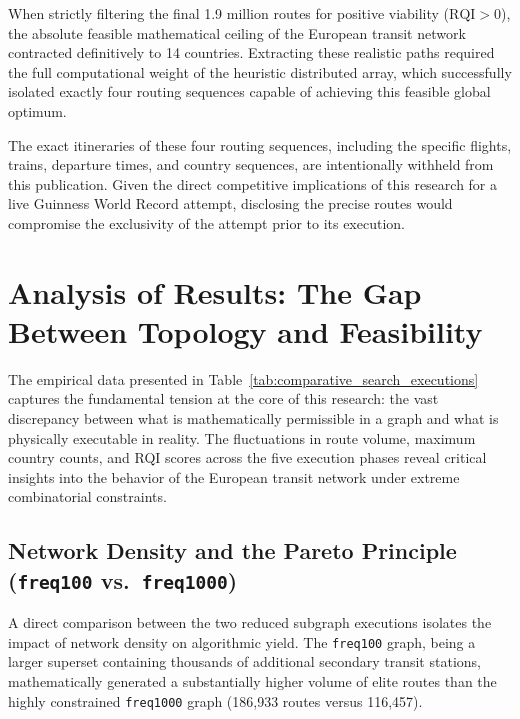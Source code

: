 \medskip

When strictly filtering the final 1.9 million routes for positive viability ($\mathrm{RQI} > 0$), the absolute feasible mathematical ceiling of the European transit network contracted definitively to 14 countries. Extracting these realistic paths required the full computational weight of the heuristic distributed array, which successfully isolated exactly four routing sequences capable of achieving this feasible global optimum.

\medskip

The exact itineraries of these four routing sequences, including the specific flights, trains, departure times, and country sequences, are intentionally withheld from this publication. Given the direct competitive implications of this research for a live Guinness World Record attempt, disclosing the precise routes would compromise the exclusivity of the attempt prior to its execution.

\section{Analysis of Results: The Gap Between Topology and Feasibility}
\label{sec:analysis_results_gap_topology_feasibility}

The empirical data presented in Table~\ref{tab:comparative_search_executions} captures the fundamental tension at the core of this research: the vast discrepancy between what is mathematically permissible in a graph and what is physically executable in reality. The fluctuations in route volume, maximum country counts, and RQI scores across the five execution phases reveal critical insights into the behavior of the European transit network under extreme combinatorial constraints.

\subsection{Network Density and the Pareto Principle (\texttt{freq100} vs.\ \texttt{freq1000})}
\label{subsec:network_density_pareto_principle}

A direct comparison between the two reduced subgraph executions isolates the impact of network density on algorithmic yield. The \texttt{freq100} graph, being a larger superset containing thousands of additional secondary transit stations, mathematically generated a substantially higher volume of elite routes than the highly constrained \texttt{freq1000} graph (186,933 routes versus 116,457).

